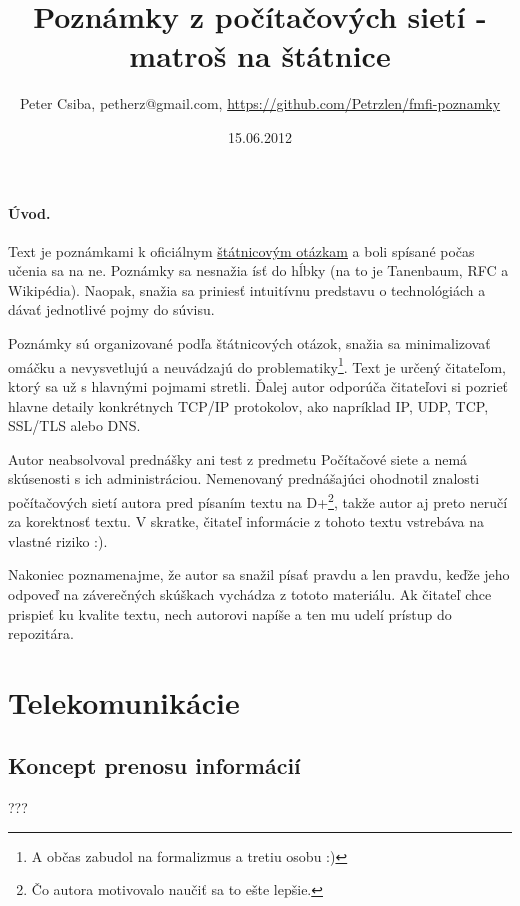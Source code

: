\documentclass[10pt,a4paper]{article}
\title{Poznámky z počítačových sietí - matroš na štátnice}
\date{15.06.2012}
\author{Peter Csiba, petherz@gmail.com, \url{https://github.com/Petrzlen/fmfi-poznamky}}
\begin{document}
\maketitle
\tableofcontents

\clearpage

\paragraph{Úvod.}   

Text je poznámkami k oficiálnym \href{http://new.dcs.fmph.uniba.sk/index.php/Studium/Bakalarske/StatneSkusky}{štátnicovým otázkam} a boli spísané počas učenia sa na ne.
Poznámky sa nesnažia ísť do hĺbky (na to je Tanenbaum, RFC a Wikipédia). Naopak, snažia sa priniesť intuitívnu predstavu o technológiách a dávať jednotlivé pojmy do súvisu. 

Poznámky sú organizované podľa štátnicových otázok, snažia sa minimalizovať omáčku a nevysvetlujú a neuvádzajú do problematiky\footnote{
A občas zabudol na formalizmus a tretiu osobu :) 
}. Text je určený čitateľom, ktorý sa už s hlavnými pojmami stretli.
Ďalej autor odporúča čitateľovi si pozrieť hlavne detaily konkrétnych TCP/IP protokolov, ako napríklad IP, UDP, TCP, SSL/TLS alebo DNS. 

Autor neabsolvoval prednášky ani test z predmetu Počítačové siete a nemá skúsenosti s ich administráciou. Nemenovaný prednášajúci ohodnotil znalosti počítačových sietí autora pred písaním textu na D+\footnote{
Čo autora motivovalo naučiť sa to ešte lepšie. 
}, takže autor aj preto neručí za korektnosť textu. V skratke, čitateľ informácie z tohoto textu vstrebáva na vlastné riziko :).

Nakoniec poznamenajme, že autor sa snažil písať pravdu a len pravdu, keďže jeho odpoveď na záverečných skúškach vychádza z tototo materiálu. 
Ak čitateľ chce prispieť ku kvalite textu, nech autorovi napíše a ten mu udelí prístup do repozitára. 

\section{Telekomunikácie}           
\subsection{Koncept prenosu informácií} 
???
\end{document}
